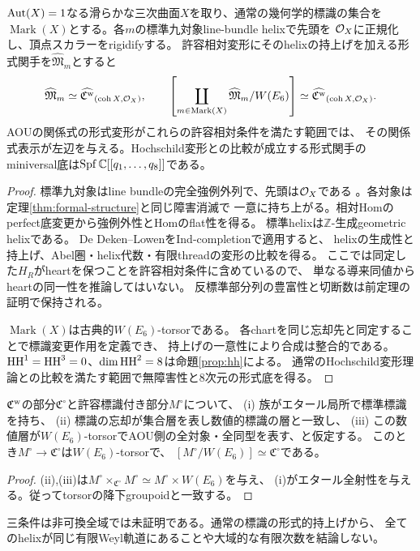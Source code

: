 \begin{theorem}[通常の標識に限った形式Weyl商]\label{thm:formal-weyl}
$\operatorname{Aut}(X)=1$なる滑らかな三次曲面$X$を取り、通常の幾何学的標識の集合を
$\operatorname{Mark}(X)$とする。各$m$の標準九対象line-bundle helixで先頭を
$\mathcal O_X$に正規化し、頂点スカラーをrigidifyする。
許容相対変形にそのhelixの持上げを加える形式関手を$\widehat{\mathfrak M}_m$とすると
\[
 \widehat{\mathfrak M}_m\simeq\widehat{\mathfrak C^{\rm w}}_{(\operatorname{coh}X,\mathcal O_X)},\qquad
 \left[\coprod_{m\in\operatorname{Mark}(X)}\widehat{\mathfrak M}_m/W(E_6)\right]
 \simeq\widehat{\mathfrak C^{\rm w}}_{(\operatorname{coh}X,\mathcal O_X)}.
\]
AOUの関係式の形式変形がこれらの許容相対条件を満たす範囲では、
その関係式表示が左辺を与える。Hochschild変形との比較が成立する形式関手の
miniversal底は$\operatorname{Spf}\mathbb C[[q_1,\ldots,q_8]]$である。
\end{theorem}
\begin{proof}
標準九対象はline bundleの完全強例外列で、先頭は$\mathcal O_X$である
\cite[(4.1), (9.44)]{AOU}。各対象は定理\ref{thm:formal-structure}と同じ障害消滅で
一意に持ち上がる。相対Homのperfect底変更から強例外性とHomのflat性を得る。
標準helixは$\mathbb Z$-生成geometric helixである。
De Deken--Lowen\cite[Theorems 4.5, 5.13, 5.15]{DDL}をInd-completionで適用すると、
helixの生成性と持上げ、Abel圏・helix代数・有限threadの変形の比較を得る。
ここでは同定した$H_R$がheartを保つことを許容相対条件に含めているので、
単なる導来同値からheartの同一性を推論してはいない。
反標準部分列の豊富性と切断数は前定理の証明で保持される。

$\operatorname{Mark}(X)$は古典的$W(E_6)$-torsorである\cite[\S2.3]{AOU}。
各chartを同じ忘却先と同定することで標識変更作用を定義でき、
持上げの一意性により合成は整合的である。
$\operatorname{HH}^1=\operatorname{HH}^3=0$、$\dim\operatorname{HH}^2=8$は命題\ref{prop:hh}による。
通常のHochschild変形理論との比較を満たす範囲で無障害性と8次元の形式底を得る。
\end{proof}

\begin{proposition}[大域商の十分条件]\label{prop:global-weyl-criterion}
$\mathfrak C^{\rm w}$の部分$\mathfrak C^\circ$と許容標識付き部分$M^\circ$について、
(i) 族がエタール局所で標準標識を持ち、
(ii) 標識の忘却が集合層を表し数値的標識の層と一致し、
(iii) この数値層が$W(E_6)$-torsorでAOU側の全対象・全同型を表す、と仮定する。
このとき$M^\circ\to\mathfrak C^\circ$は$W(E_6)$-torsorで、
$[M^\circ/W(E_6)]\simeq\mathfrak C^\circ$である。
\end{proposition}
\begin{proof}
(ii),(iii)は$M^\circ\times_{\mathfrak C^\circ}M^\circ\simeq M^\circ\times W(E_6)$を与え、
(i)がエタール全射性を与える。従ってtorsorの降下groupoidと一致する。
\end{proof}
三条件は非可換全域では未証明である。通常の標識の形式的持上げから、
全てのhelixが同じ有限Weyl軌道にあることや大域的な有限次数を結論しない。

